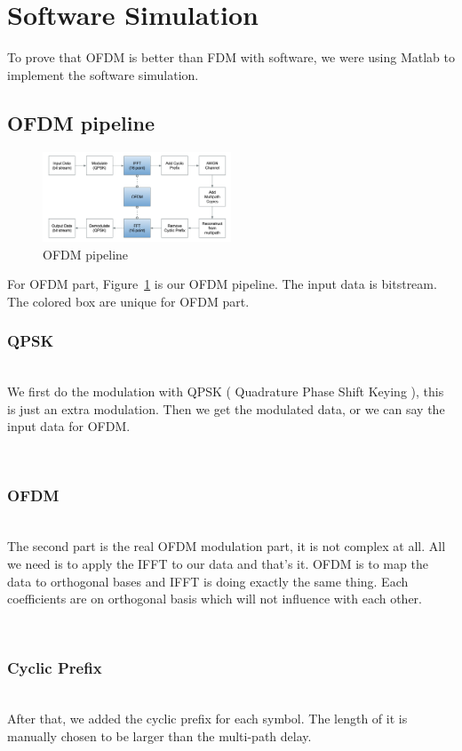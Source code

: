 \documentclass[twocolumn,conference]{IEEEtran}
\begin{document}
\section{Software Simulation}
To prove that OFDM is better than FDM with software, we were using Matlab to implement the software simulation.
\subsection{OFDM pipeline}
\begin{figure}[h]
    \centering
    \includegraphics[width=0.5\textwidth]{./asset/OFDM_pipeline}
    \caption{OFDM pipeline}
    \label{fig:OFDM_pipeline}
\end{figure}
For OFDM part, Figure~\ref{fig:OFDM_pipeline} is our OFDM pipeline. The input data is bitstream. The colored box are unique for OFDM part.
    \hfill\\\subsubsection{QPSK}\hfill\\
    \indent We first do the modulation with QPSK ( Quadrature Phase Shift Keying ), this is just an extra modulation. Then we get the modulated data, or we can say the input data for OFDM.

    \hfill\\\subsubsection{OFDM}\hfill\\
    \indent The second part is the real OFDM modulation part, it is not complex at all. All we need is to apply the IFFT to our data and that’s it. OFDM is to map the data to orthogonal bases and IFFT is doing exactly the same thing. Each coefficients are on orthogonal basis which will not influence with each other.

    \hfill\\\subsubsection{Cyclic Prefix}\hfill\\
    \indent After that, we added the cyclic prefix for each symbol. The length of it is manually chosen to be larger than the multi-path delay.
\end{document}
